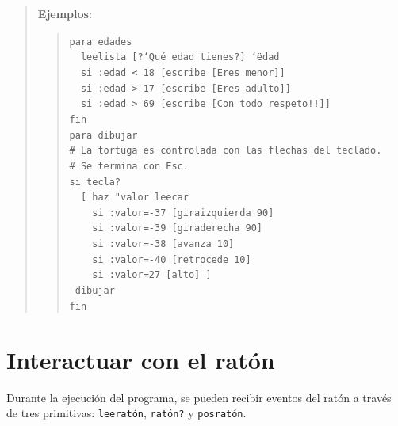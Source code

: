 \begin{quote}
   \noindent \textbf{Ejemplos}:
   \begin{quote}
      \verb+para edades+\\
      \verb+  leelista +\texttt{[?`Qu\'e edad tienes?] \char`\"{}edad}\\
      \verb+  si :edad < 18 [escribe [Eres menor]]+\\
      \verb+  si :edad > 17 [escribe [Eres adulto]]+\\
      \verb+  si :edad > 69 [escribe [Con todo respeto!!]]+\\
      \verb+fin+\\

      \verb+para dibujar+ \\
      \verb+# La tortuga es controlada con las flechas del teclado.+ \\
      \verb+# Se termina con Esc.+ \\
      \verb+si tecla?+ \\
      \verb+  [ haz "valor leecar+ \\
      \verb+    si :valor=-37 [giraizquierda 90]+ \\
      \verb+    si :valor=-39 [giraderecha 90]+ \\
      \verb+    si :valor=-38 [avanza 10]+ \\
      \verb+    si :valor=-40 [retrocede 10]+ \\
      \verb+    si :valor=27 [alto] ]+ \\
      \verb+ dibujar+ \\
      \verb+fin+\end{quote}
\end{quote}

\section{Interactuar con el rat\'on}
    \label{Interactuar-Raton}

Durante la ejecuci\'on del programa, se pueden recibir eventos del rat\'on
a trav\'es de tres primitivas:
\texttt{leerat\'on}, 
\texttt{rat\'on?}  y
\texttt{posrat\'on}.


